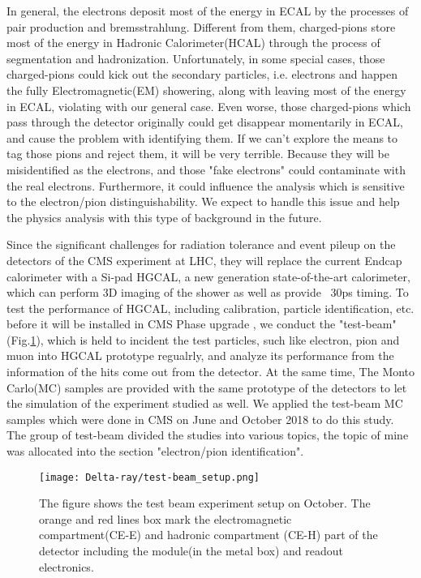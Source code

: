 \documentclass[12pt,twoside,a4paper,an,final]{cms-tdr}
\begin{document}
In general, the electrons deposit most of the energy in ECAL by the processes of pair production and bremsstrahlung. Different from them, charged-pions store most of the energy in Hadronic Calorimeter(HCAL) through the process of segmentation and hadronization. Unfortunately, in some special cases, those charged-pions could kick out the secondary particles, i.e. electrons and happen the fully Electromagnetic(EM) showering, along with leaving most of the energy in ECAL, violating with our general case. Even worse, those charged-pions which pass through the detector originally could get disappear momentarily in ECAL, and cause the problem with identifying them. If we can't explore the means to tag those pions and reject them, it will be very terrible. Because they will be misidentified as the electrons, and those "fake electrons" could contaminate with the real electrons.  Furthermore, it could influence the analysis which is sensitive to the electron/pion distinguishability. We expect to handle this issue and help the physics analysis with this type of background in the future.

Since the significant challenges for radiation tolerance and event pileup on the detectors of the CMS experiment at LHC, they will replace the current Endcap calorimeter with a Si-pad HGCAL, a new generation state-of-the-art calorimeter, which can perform 3D imaging of the shower as well as provide ~30ps timing. To test the performance of HGCAL, including calibration, particle identification, etc. before it will be installed in CMS Phase  upgrade , we conduct the "test-beam"(Fig.\ref{test_beam_setup_1}), which is held to incident the test particles, such like electron, pion and muon into HGCAL prototype regualrly, and analyze its performance from the information of the hits come out from the detector. At the same time,  The Monto Carlo(MC) samples are provided with the same prototype of the detectors to let the simulation of the experiment studied as well.  We applied the test-beam MC samples which were done in CMS on June and October 2018 to do this study. The group of test-beam divided the studies into various topics, the topic of mine was allocated into the section "electron/pion identification".
\begin{figure}[!htb]
\centering 
     \texttt{[image: Delta-ray/test-beam\_setup.png]}
\caption{The figure shows the test beam experiment setup on October. The orange and red lines box mark the electromagnetic compartment(CE-E) and hadronic compartment (CE-H) part of the detector including the module(in the metal box) and readout electronics.}
\label{test_beam_setup_1}
\end{figure}
\end{document}
